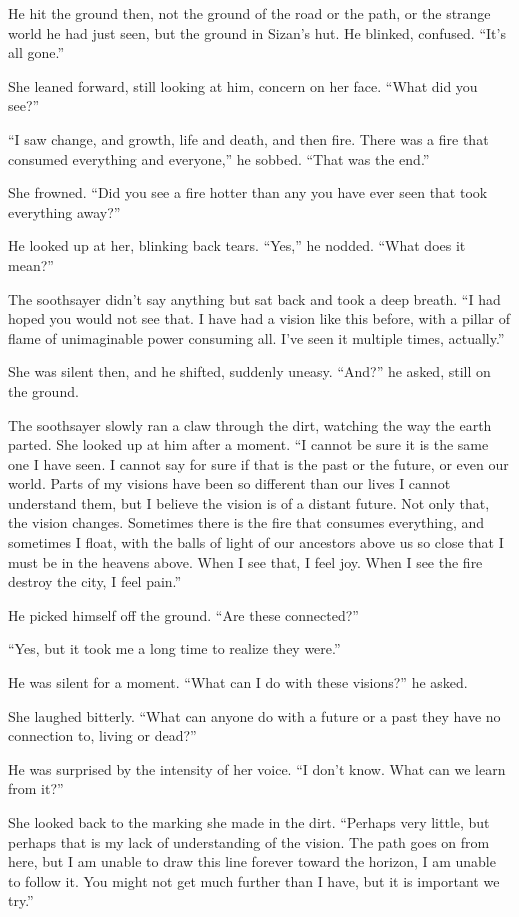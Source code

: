 He hit the ground then, not the ground of the road or the path, or the strange world he had just seen, but the ground in Sizan's hut. He blinked, confused. ``It's all gone.''

She leaned forward, still looking at him, concern on her face. ``What did you see?''

``I saw change, and growth, life and death, and then fire. There was a fire that consumed everything and everyone,'' he sobbed. ``That was the end.''

She frowned. ``Did you see a fire hotter than any you have ever seen that took everything away?''

He looked up at her, blinking back tears. ``Yes,'' he nodded. ``What does it mean?''

The soothsayer didn't say anything but sat back and took a deep breath. ``I had hoped you would not see that. I have had a vision like this before, with a pillar of flame of unimaginable power consuming all. I've seen it multiple times, actually.''

She was silent then, and he shifted, suddenly uneasy. ``And?'' he asked, still on the ground.

The soothsayer slowly ran a claw through the dirt, watching the way the earth parted. She looked up at him after a moment. ``I cannot be sure it is the same one I have seen. I cannot say for sure if that is the past or the future, or even our world. Parts of my visions have been so different than our lives I cannot understand them, but I believe the vision is of a distant future. Not only that, the vision changes. Sometimes there is the fire that consumes everything, and sometimes I float, with the balls of light of our ancestors above us so close that I must be in the heavens above. When I see that, I feel joy. When I see the fire destroy the city, I feel pain.''

He picked himself off the ground. ``Are these connected?''

``Yes, but it took me a long time to realize they were.''

He was silent for a moment. ``What can I do with these visions?'' he asked.

She laughed bitterly. ``What can anyone do with a future or a past they have no connection to, living or dead?''

He was surprised by the intensity of her voice. ``I don't know. What can we learn from it?''

She looked back to the marking she made in the dirt. ``Perhaps very little, but perhaps that is my lack of understanding of the vision. The path goes on from here, but I am unable to draw this line forever toward the horizon, I am unable to follow it. You might not get much further than I have, but it is important we try.''

